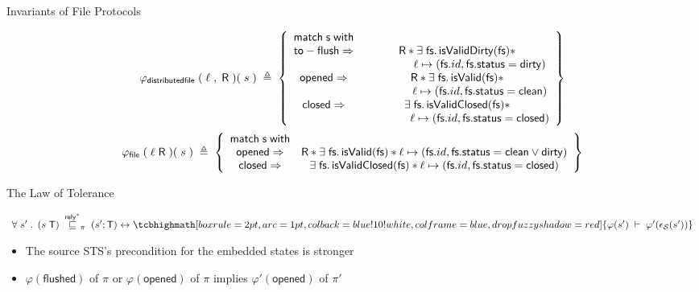 \documentclass[aspectratio=169,xcolor=dvipsnames]{beamer}
\begin{document}
\begin{frame}{Invariants of File Protocols} \scriptsize
\begin{definition}    
    \[
\varphi_{\mathsf{distributedfile}} \;(\;\ell\;, \;\mathsf{R}\;)( \;s \; )\;\triangleq \;
\left\{
\begin{array}{cc}
\mathsf{match}\; \mathsf{s} \; \mathsf{with}\\
  \mathsf{to-flush} \Rightarrow  &  \mathsf{R} \ast \exists \; \mathsf{fs} \ldotp \mathsf{isValidDirty}(\mathsf{fs}) \ast \\ & \quad\quad\quad\quad \ell \mapsto (\mathsf{fs}.id,\mathsf{fs}.\mathsf{status}=\mathsf{dirty})  \\
   \mathsf{opened} \Rightarrow  &  \mathsf{R} \ast \exists \; \mathsf{fs} \ldotp \mathsf{isValid}(\mathsf{fs}) \ast \\ & \quad\quad\quad\quad \ell \mapsto (\mathsf{fs}.id,\mathsf{fs}.\mathsf{status}=\mathsf{clean}) \\
   \mathsf{closed} \Rightarrow  & \exists \; \mathsf{fs} \ldotp \mathsf{isValidClosed}(\mathsf{fs}) \ast \\ & \quad\quad\quad\quad \ell \mapsto (\mathsf{fs}.id,\mathsf{fs}.\mathsf{status}=\textsf{closed}) 
\end{array}
\right\}
\]
\[
\varphi_{\mathsf{file}} \;(\;\ell \;\mathsf{R}\;)( \;s \;)\; \triangleq \;
\left\{
\begin{array}{cc}
\mathsf{match}\; \mathsf{s} \; \mathsf{with}\\
   \mathsf{opened} \Rightarrow  &  \mathsf{R} \ast \exists \; \mathsf{fs} \ldotp \mathsf{isValid}(\mathsf{fs}) \ast \ell \mapsto (\mathsf{fs}.id,\mathsf{fs}.\mathsf{status}=\mathsf{clean} \lor \mathsf{dirty}) \\
   \mathsf{closed} \Rightarrow  & \exists \; \mathsf{fs} \ldotp \mathsf{isValidClosed}(\mathsf{fs}) \ast \ell \mapsto (\mathsf{fs}.id,\mathsf{fs}.\mathsf{status}=\mathsf{closed}) 
\end{array}
\right\}
\]
\end{definition}
\end{frame}
\begin{frame}{The Law of Tolerance}\scriptsize
        \begin{theorem}
        \[\begin{array}{l} \forall \; s' \;\ldotp\;  (s \; \mathsf{T}) \;\overset{\mathsf{rely}^{*}}{\sqsubseteq}_{\pi} \;(s';\mathsf{T}) \leftrightarrow   \tcbhighmath[boxrule=2pt,arc=1pt,colback=blue!10!white,colframe=blue,
  drop fuzzy shadow=red]{\varphi(s') \;\vdash \;\varphi'(\epsilon_{\mathcal{S}}(s'))} \end{array}\]
        \end{theorem}
        \begin{itemize}
        \item The source STS's precondition for the embedded states is stronger
            \item $\varphi(\mathsf{flushed})$ of $\pi$ or $\varphi(\mathsf{opened})$ of $\pi$ implies $\varphi'(\textsf{opened})$ of $\pi'$
        \end{itemize}
\end{frame}
\end{document}
